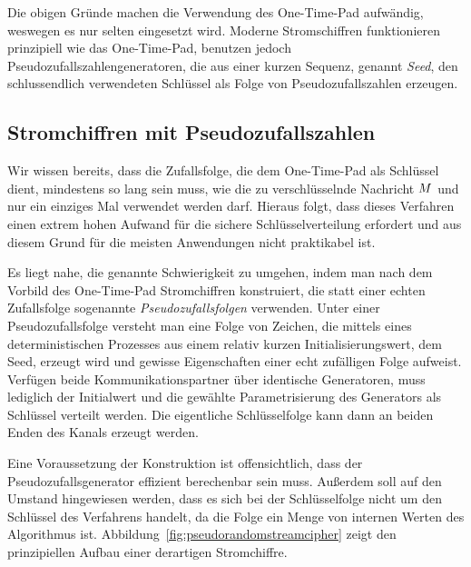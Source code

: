 Die obigen Gründe machen die Verwendung des One-Time-Pad aufwändig, weswegen es nur selten eingesetzt wird. Moderne Stromschiffren funktionieren prinzipiell wie das One-Time-Pad, benutzen jedoch Pseudozufallszahlengeneratoren, die aus einer kurzen Sequenz, genannt \emph{Seed}, den schlussendlich verwendeten Schlüssel als Folge von Pseudozufallszahlen erzeugen.

\subsection{Stromchiffren mit Pseudozufallszahlen}
\label{ssec:stromchiffrenpseudozufall}
Wir wissen bereits, dass die Zufallsfolge, die dem One-Time-Pad als Schlüssel dient, mindestens so lang sein muss, wie die zu verschlüsselnde Nachricht $M$ und nur ein einziges Mal verwendet werden darf. Hieraus folgt, dass dieses Verfahren einen extrem hohen Aufwand für die sichere Schlüsselverteilung erfordert und aus diesem Grund für die meisten Anwendungen nicht praktikabel ist.

Es liegt nahe, die genannte Schwierigkeit zu umgehen, indem man nach dem Vorbild des One-Time-Pad Stromchiffren konstruiert, die statt einer echten Zufallsfolge sogenannte \emph{Pseudozufallsfolgen} verwenden. Unter einer Pseudozufallsfolge versteht man eine Folge von Zeichen, die mittels eines deterministischen Prozesses aus einem relativ kurzen Initialisierungswert, dem Seed, erzeugt wird und gewisse Eigenschaften einer echt zufälligen Folge aufweist. Verfügen beide Kommunikationspartner über identische Generatoren, muss lediglich der Initialwert und die gewählte Parametrisierung des Generators als Schlüssel verteilt werden. Die eigentliche Schlüsselfolge kann dann an beiden Enden des Kanals erzeugt werden.

Eine Voraussetzung der Konstruktion ist offensichtlich, dass der Pseudozufallsgenerator effizient berechenbar sein muss. Außerdem soll auf den Umstand hingewiesen werden, dass es sich bei der Schlüsselfolge nicht um den Schlüssel des Verfahrens handelt, da die Folge ein Menge von internen Werten des Algorithmus ist. Abbildung~\ref{fig:pseudorandomstreamcipher} zeigt den prinzipiellen Aufbau einer derartigen Stromchiffre.

